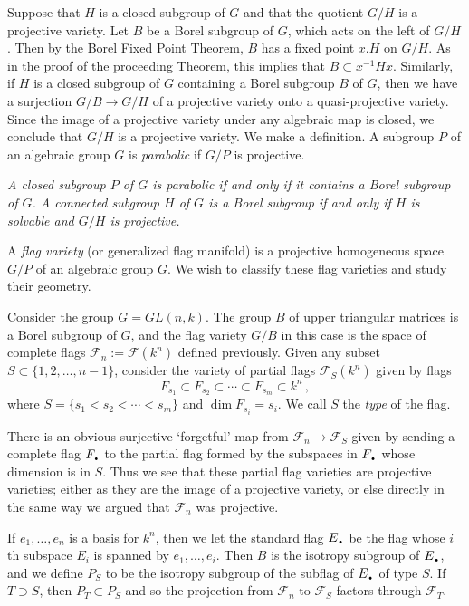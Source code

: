 \documentclass[12pt]{amsart}
\begin{document}
Suppose that $H$ is a closed subgroup of $G$ and that the quotient $G/H$ is
a projective variety.
Let $B$ be a Borel subgroup of $G$, which acts on the left of $G/H$.
Then by the Borel Fixed Point Theorem, $B$ has a fixed point $x.H$ on $G/H$. 
As in the proof of the proceeding Theorem, this implies that 
$B\subset x^{-1}Hx$.
Similarly, if $H$ is a closed subgroup of $G$ containing a Borel subgroup
$B$ of $G$, then we have a surjection $G/B\to G/H$ of a projective variety
onto a quasi-projective variety.
Since the image of a projective variety under any algebraic map is closed,
we conclude that $G/H$ is a projective variety.
We make a definition.
A subgroup $P$ of an algebraic group $G$ is {\sl parabolic} if $G/P$ is
projective. 
\medskip

{\it
A closed subgroup $P$ of $G$ is parabolic if and only if it contains a Borel
subgroup of $G$.
A connected subgroup $H$ of $G$ is a Borel subgroup if and only if $H$ is
solvable and $G/H$ is projective.}\medskip


A {\sl flag variety} (or generalized flag manifold) is a projective
homogeneous space $G/P$ of an algebraic group $G$.
We wish to classify these flag varieties and study their geometry.
\medskip

Consider the group $G=GL(n,k)$.
The group $B$ of upper triangular matrices is a Borel subgroup of $G$, and
the flag variety $G/B$ in this case is the space of complete flags
${\mathcal F}_n:={\mathcal F}(k^n)$ defined previously.
Given any subset $S\subset \{1,2,\ldots,n-1\}$, consider the variety of
partial flags ${\mathcal F}_S(k^n)$ given by flags
$$
   F_{s_1}\subset F_{s_2}\subset \cdots \subset F_{s_m}\subset k^n\,,
$$
where $S=\{s_1<s_2<\cdots<s_m\}$ and $\dim F_{s_i}=s_i$.
We call $S$ the {\sl type} of the flag.

There is an obvious surjective `forgetful' map from 
${\mathcal F}_n\to {\mathcal F}_S$ given by sending a complete flag
$F_{{\mbox{\Large\bf .}}}$ to the partial flag formed by the subspaces in $F_{{\mbox{\Large\bf .}}}$ whose
dimension is in $S$.
Thus we see that these partial flag varieties are projective varieties;
either as they are the image of a projective variety, or else directly in
the same way we argued that ${\mathcal F}_n$ was projective.

If $e_1,\ldots, e_n$ is a basis for $k^n$, then we let the standard flag
$E_{{\mbox{\Large\bf .}}}$ be the flag whose $i$th subspace $E_i$ is spanned by
$e_1,\ldots, e_i$.
Then $B$ is the isotropy subgroup of $E_{{\mbox{\Large\bf .}}}$, and we define $P_S$ to be
the isotropy subgroup of the subflag of $E_{{\mbox{\Large\bf .}}}$ of type $S$.
If $T\supset S$, then $P_T\subset P_S$ and so the projection from 
${\mathcal F}_n$ to ${\mathcal F}_S$ factors through ${\mathcal F}_T$. 
\end{document}
